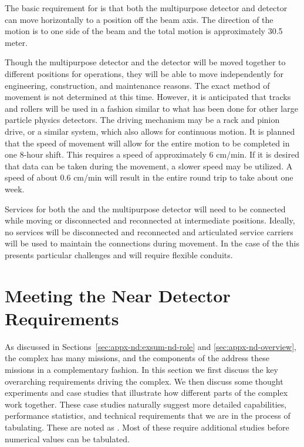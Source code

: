 The basic requirement for  is that both the multipurpose detector and  detector can move horizontally to a position off the beam axis. The direction of the motion is to one side of the beam and the total motion is approximately 30.5 meter. 

Though the multipurpose detector and the  detector will be moved together to different positions for operations, they will be able to move independently for engineering, construction, and maintenance reasons.  The exact method of movement is not determined at this time. However, it is anticipated that tracks and rollers will be used in a fashion similar to what has been done for other large particle physics detectors. The driving mechanism may be a rack and pinion drive, or a similar system, which also allows for continuous motion. 
It is planned that the speed of movement will allow for the entire motion to be completed in one 8-hour shift. This requires a speed of approximately 6 cm/min. If it is desired that data can be taken during the movement, a slower speed may be utilized. A speed of about 0.6 cm/min will result in the entire round trip to take about one week. 

Services for both the  and the multipurpose detector will need to be connected while moving or disconnected and reconnected at intermediate positions. Ideally, no services will be disconnected and reconnected and articulated service carriers will be used to maintain the connections during movement. In the case of the  this presents particular challenges and will require flexible conduits. 




\chapter{Meeting the Near Detector Requirements}
\label{sec:appx-nd:requirements}

As discussed in Sections~\ref{sec:appx-nd:exsum-nd-role} and \ref{sec:appx-nd-overview}, the    complex has many missions, and the components of the    address these missions in a complementary fashion. In this section we first discuss the key overarching requirements driving the  complex. We then discuss some thought experiments and case studies that illustrate how different parts of the complex work together. These case studies naturally suggest more detailed capabilities, performance statistics, and technical requirements that we are in the process of tabulating. These are noted as . Most of these require additional studies before numerical values can be tabulated.



